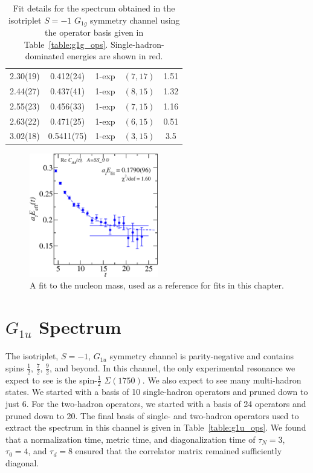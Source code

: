 \begin{table}[H]
\begin{tabu}{c|c|c|c|c}
        2.30(19)&0.412(24)&1{-}exp&$(7, 17)$&1.51 \\
        2.44(27)&0.437(41)&1{-}exp&$(8, 15)$&1.32 \\
        \rowfont{\color{red}}
        2.55(23)&0.456(33)&1{-}exp&$(7, 15)$&1.16 \\
        2.63(22)&0.471(25)&1{-}exp&$(6, 15)$&0.51 \\
        3.02(18)&0.5411(75)&1{-}exp&$(3, 15)$&3.5 \\
    \end{tabu}
    \caption[Fit details for the spectrum obtained in the isotriplet $S=-1$ $G_{1g}$ symmetry channel using the operator basis given in Table~\ref{table:g1g_ops}.]{Fit details for the spectrum obtained in the isotriplet $S=-1$ $G_{1g}$ symmetry channel using the operator basis given in Table~\ref{table:g1g_ops}. Single-hadron-dominated energies are shown in red.}\label{table:g1g_fits}
\end{table}
\renewcommand{\arraystretch}{1.5}

\begin{figure}[H]
    \centering
    \hspace*{-1.5cm}\includegraphics[width=0.5\textwidth]{figures/nucleon.pdf}
    \caption{A fit to the nucleon mass, used as a reference for fits in this chapter.}\label{fig:nucleon_fit}
\end{figure}

\section{$G_{1u}$ Spectrum}
The isotriplet, $S=-1$, $G_{1u}$ symmetry channel is parity-negative and contains spins $\frac{1}{2}$, $\frac{7}{2}$, $\frac{9}{2}$, and beyond. In this channel, the only experimental resonance we expect to see is the spin-$\frac{1}{2}$ $\Sigma(1750)$. We also expect to see many multi-hadron states. We started with a basis of 10 single-hadron operators and pruned down to just 6. For the two-hadron operators, we started with a basis of 24 operators and pruned down to 20. The final basis of single- and two-hadron operators used to extract the spectrum in this channel is given in Table~\ref{table:g1u_ops}. We found that a normalization time, metric time, and diagonalization time of $\tau_N=3$, $\tau_0=4$, and $\tau_d=8$ ensured that the correlator matrix remained sufficiently diagonal.

